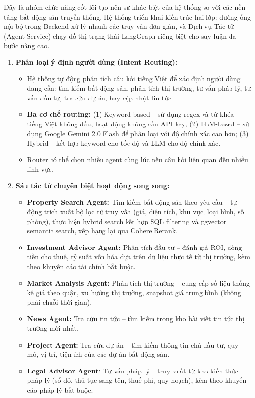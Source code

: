 Đây là nhóm chức năng cốt lõi tạo nên sự khác biệt của hệ thống so với các nền tảng bất động sản truyền thống. Hệ thống triển khai kiến trúc hai lớp: đường ống nội bộ trong Backend xử lý nhanh các truy vấn đơn giản, và Dịch vụ Tác tử (Agent Service) chạy đồ thị trạng thái LangGraph riêng biệt cho suy luận đa bước nâng cao.

\begin{enumerate}
    \item \textbf{Phân loại ý định người dùng (Intent Routing):}
    \begin{itemize}
        \item Hệ thống tự động phân tích câu hỏi tiếng Việt để xác định người dùng đang cần: tìm kiếm bất động sản, phân tích thị trường, tư vấn pháp lý, tư vấn đầu tư, tra cứu dự án, hay cập nhật tin tức.
        \item \textbf{Ba cơ chế routing:} (1) Keyword-based -- sử dụng regex và từ khóa tiếng Việt không dấu, hoạt động không cần API key; (2) LLM-based -- sử dụng Google Gemini 2.0 Flash để phân loại với độ chính xác cao hơn; (3) Hybrid -- kết hợp keyword cho tốc độ và LLM cho độ chính xác.
        \item Router có thể chọn nhiều agent cùng lúc nếu câu hỏi liên quan đến nhiều lĩnh vực.
    \end{itemize}

    \item \textbf{Sáu tác tử chuyên biệt hoạt động song song:}
    \begin{itemize}
        \item \textbf{Property Search Agent:} Tìm kiếm bất động sản theo yêu cầu -- tự động trích xuất bộ lọc từ truy vấn (giá, diện tích, khu vực, loại hình, số phòng), thực hiện hybrid search kết hợp SQL filtering và pgvector semantic search, xếp hạng lại qua Cohere Rerank.
        \item \textbf{Investment Advisor Agent:} Phân tích đầu tư -- đánh giá ROI, dòng tiền cho thuê, tỷ suất vốn hóa dựa trên dữ liệu thực tế từ thị trường, kèm theo khuyến cáo tài chính bắt buộc.
        \item \textbf{Market Analysis Agent:} Phân tích thị trường -- cung cấp số liệu thống kê giá theo quận, xu hướng thị trường, snapshot giá trung bình (không phải chuỗi thời gian).
        \item \textbf{News Agent:} Tra cứu tin tức -- tìm kiếm trong kho bài viết tin tức thị trường mới nhất.
        \item \textbf{Project Agent:} Tra cứu dự án -- tìm kiếm thông tin chủ đầu tư, quy mô, vị trí, tiện ích của các dự án bất động sản.
        \item \textbf{Legal Advisor Agent:} Tư vấn pháp lý -- truy xuất từ kho kiến thức pháp lý (sổ đỏ, thủ tục sang tên, thuế phí, quy hoạch), kèm theo khuyến cáo pháp lý bắt buộc.
    \end{itemize}


\end{enumerate}
